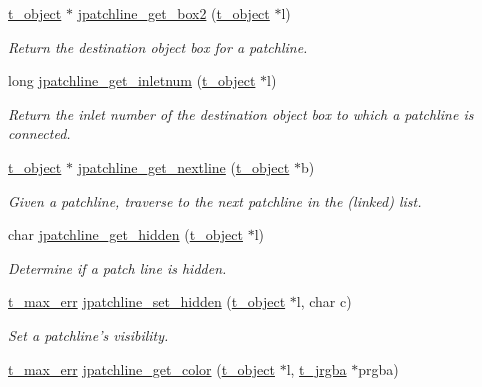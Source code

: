 \begin{DoxyCompactItemize}
\hyperlink{structt__object}{t\_\-object} $\ast$ \hyperlink{group__jpatchline_ga8785673e61f9b9406e4c77df1b7781b1}{jpatchline\_\-get\_\-box2} (\hyperlink{structt__object}{t\_\-object} $\ast$l)
\begin{DoxyCompactList}\small\item\em Return the destination object box for a patchline. \item\end{DoxyCompactList}\item 
long \hyperlink{group__jpatchline_ga01dc2867e149ca5d165a5efd852b80b0}{jpatchline\_\-get\_\-inletnum} (\hyperlink{structt__object}{t\_\-object} $\ast$l)
\begin{DoxyCompactList}\small\item\em Return the inlet number of the destination object box to which a patchline is connected. \item\end{DoxyCompactList}\item 
\hyperlink{structt__object}{t\_\-object} $\ast$ \hyperlink{group__jpatchline_ga1aed89ce61ea59fbc47a282e25398aa8}{jpatchline\_\-get\_\-nextline} (\hyperlink{structt__object}{t\_\-object} $\ast$b)
\begin{DoxyCompactList}\small\item\em Given a patchline, traverse to the next patchline in the (linked) list. \item\end{DoxyCompactList}\item 
char \hyperlink{group__jpatchline_gaece283402d2f063de0fec372e7ad8fa5}{jpatchline\_\-get\_\-hidden} (\hyperlink{structt__object}{t\_\-object} $\ast$l)
\begin{DoxyCompactList}\small\item\em Determine if a patch line is hidden. \item\end{DoxyCompactList}\item 
\hyperlink{group__datatypes_ga73edaae82b318855cc09fac994918165}{t\_\-max\_\-err} \hyperlink{group__jpatchline_gae5bd6fbfa02559350ee2b117a55b64d5}{jpatchline\_\-set\_\-hidden} (\hyperlink{structt__object}{t\_\-object} $\ast$l, char c)
\begin{DoxyCompactList}\small\item\em Set a patchline's visibility. \item\end{DoxyCompactList}\item 
\hyperlink{group__datatypes_ga73edaae82b318855cc09fac994918165}{t\_\-max\_\-err} \hyperlink{group__jpatchline_ga9f612329fb1b675345173e56b0da8b5e}{jpatchline\_\-get\_\-color} (\hyperlink{structt__object}{t\_\-object} $\ast$l, \hyperlink{structt__jrgba}{t\_\-jrgba} $\ast$prgba)

\end{DoxyCompactItemize}
